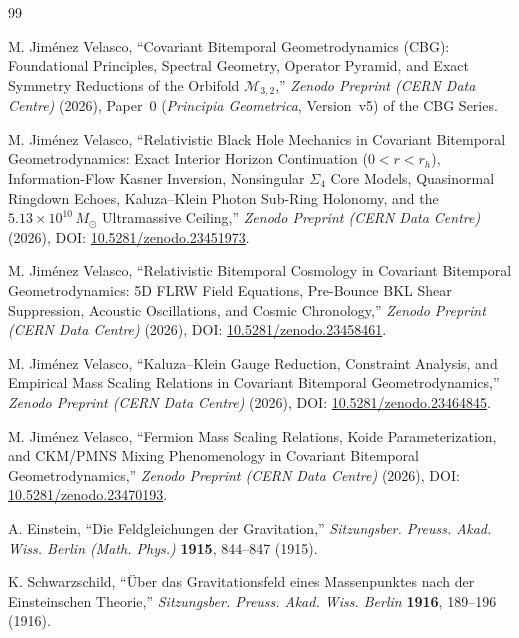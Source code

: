 \documentclass[11pt,a4paper]{article}
\theoremstyle{definition}
\theoremstyle{remark}
\begin{document}
\begin{thebibliography}{99}
\small

 M. Jim\'enez Velasco, ``Covariant Bitemporal Geometrodynamics (CBG): Foundational Principles, Spectral Geometry, Operator Pyramid, and Exact Symmetry Reductions of the Orbifold $\mathcal{M}_{3,2}$,'' \textit{Zenodo Preprint (CERN Data Centre)} (2026), Paper~0 (\textit{Principia Geometrica}, Version~v5) of the CBG Series.

 M. Jim\'enez Velasco, ``Relativistic Black Hole Mechanics in Covariant Bitemporal Geometrodynamics: Exact Interior Horizon Continuation ($0 < r < r_h$), Information-Flow Kasner Inversion, Nonsingular $\Sigma_4$ Core Models, Quasinormal Ringdown Echoes, Kaluza--Klein Photon Sub-Ring Holonomy, and the $5.13 \times 10^{10}\,M_{\odot}$ Ultramassive Ceiling,'' \textit{Zenodo Preprint (CERN Data Centre)} (2026), DOI: \href{https://doi.org/10.5281/zenodo.23451973}{10.5281/zenodo.23451973}.

 M. Jim\'enez Velasco, ``Relativistic Bitemporal Cosmology in Covariant Bitemporal Geometrodynamics: 5D FLRW Field Equations, Pre-Bounce BKL Shear Suppression, Acoustic Oscillations, and Cosmic Chronology,'' \textit{Zenodo Preprint (CERN Data Centre)} (2026), DOI: \href{https://doi.org/10.5281/zenodo.23458461}{10.5281/zenodo.23458461}.

 M. Jim\'enez Velasco, ``Kaluza--Klein Gauge Reduction, Constraint Analysis, and Empirical Mass Scaling Relations in Covariant Bitemporal Geometrodynamics,'' \textit{Zenodo Preprint (CERN Data Centre)} (2026), DOI: \href{https://doi.org/10.5281/zenodo.23464845}{10.5281/zenodo.23464845}.

 M. Jim\'enez Velasco, ``Fermion Mass Scaling Relations, Koide Parameterization, and CKM/PMNS Mixing Phenomenology in Covariant Bitemporal Geometrodynamics,'' \textit{Zenodo Preprint (CERN Data Centre)} (2026), DOI: \href{https://doi.org/10.5281/zenodo.23470193}{10.5281/zenodo.23470193}.

 A. Einstein, ``Die Feldgleichungen der Gravitation,'' \textit{Sitzungsber. Preuss. Akad. Wiss. Berlin (Math. Phys.)} \textbf{1915}, 844--847 (1915).

 K. Schwarzschild, ``\"Uber das Gravitationsfeld eines Massenpunktes nach der Einsteinschen Theorie,'' \textit{Sitzungsber. Preuss. Akad. Wiss. Berlin} \textbf{1916}, 189--196 (1916).


\end{thebibliography}
\end{document}
